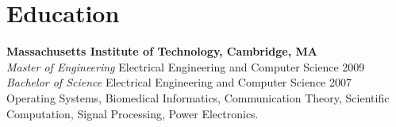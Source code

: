 \section{Education}

\textbf{Massachusetts Institute of Technology, Cambridge, MA}\\
\textit{Master of Engineering} Electrical Engineering and Computer Science
\hfill 2009 \\
\textit{Bachelor of Science} Electrical Engineering and Computer Science
\hfill 2007\\
Operating Systems, Biomedical Informatics, Communication Theory,
Scientific Computation, Signal Processing, Power Electronics.
\\
